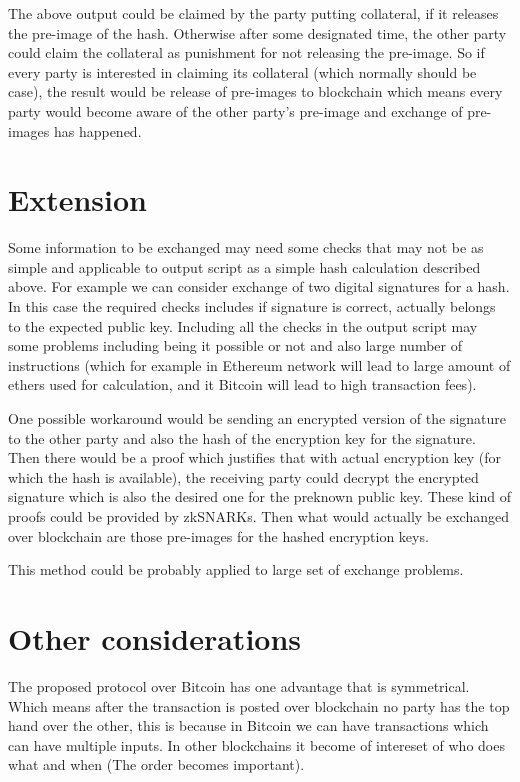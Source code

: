 \documentclass[]{article}
\begin{document}
The above output could be claimed by the party putting collateral, if it releases the pre-image of the hash. Otherwise after some designated time, the other party could claim the collateral as punishment for not releasing the pre-image. So if every party is interested in claiming its collateral (which normally should be case), the result would be release of pre-images to blockchain which means every party would become aware of the other party's pre-image and exchange of pre-images has happened.

\section{Extension}

Some information to be exchanged may need some checks that may not be as simple and applicable to output script as a simple hash calculation described above. For example we can consider exchange of two digital signatures for a hash. In this case the required checks includes if signature is correct, actually belongs to the expected public key. Including all the checks in the output script may some problems including being it possible or not and also large number of instructions (which for example in Ethereum network will lead to large amount of ethers used for calculation, and it Bitcoin will lead to high transaction fees).

One possible workaround would be sending an encrypted version of the signature to the other party and also the hash of the encryption key for the signature. Then there would be a proof which justifies that with actual encryption key (for which the hash is available), the receiving party could decrypt the encrypted signature which is also the desired one for the preknown public key. These kind of proofs could be provided by zkSNARKs\cite{ethzkSNARK}. Then what would actually be exchanged over blockchain are those pre-images for the hashed encryption keys.

This method could be probably applied to large set of exchange problems.

\section{Other considerations}

The proposed protocol over Bitcoin has one advantage that is symmetrical. Which means after the transaction is posted over blockchain no party has the top hand over the other, this is because in Bitcoin we can have transactions which can have multiple inputs. In other blockchains it become of intereset of who does what and when (The order becomes important).
\end{document}

